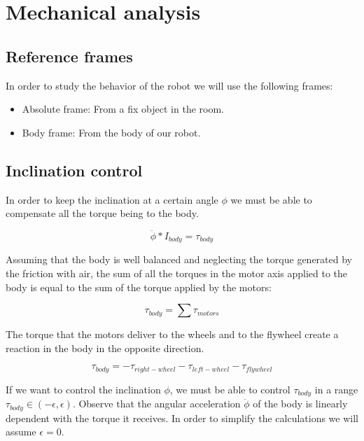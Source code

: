 \section{Mechanical analysis}
\subsection{Reference frames}
In order to study the behavior of the robot we will use the following frames:
\begin{itemize}
    \item Absolute frame: From a fix object in the room. 
    \item Body frame: From the body of our robot.
\end{itemize}



\subsection{Inclination control}
In order to keep the inclination at a certain angle $\phi$ we must be able to compensate all the torque being to the body.

\[\ddot{\phi} * I_{body} = \tau_{body} \]

Assuming that the body is well balanced and neglecting the torque generated by the friction with air, the sum of all the torques in the motor axis applied to the body is equal to the sum of the torque applied by the motors:

\[\tau_{body} = \sum \tau_{motors}\]

The torque that the motors deliver to the wheels and to the flywheel create a reaction in the body in the opposite direction.


\[\tau_{body} = -\tau_{right-wheel} -\tau_{left-wheel} -\tau_{flywheel} \]

If we want to control the inclination $\phi$, we must be able to control $\tau_{body}$ in a range $\tau_{body} \in (-\epsilon, \epsilon)$. Observe that the angular acceleration $\ddot{\phi}$ of the body is linearly dependent with the torque it receives. In order to simplify the calculations we will assume $\epsilon = 0$.

